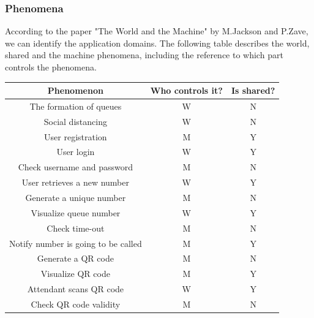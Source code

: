 \documentclass[table, 12pt]{article}
\begin{document}
\subsubsection{Phenomena}
According to the paper "The World and the Machine" by M.Jackson and P.Zave, we can identify the application domains. The following table describes the world, shared and the machine phenomena, including the reference to which part controls the phenomena.
\begin{center}
    \begin{table}
        \begin{tabular}{|c|c|c|}
            \hline
            \rowcolor{blue!50}
            Phenomenon                                 & Who controls it? & Is shared? \\
            \hline
            The formation of queues                    & W                & N          \\
            Social distancing                          & W                & N          \\
            User registration                          & M                & Y          \\
            User login                                 & W                & Y          \\
            Check username and password                & M                & N          \\
            User retrieves a new number                & W                & Y          \\
            Generate a unique number                   & M                & N          \\
            Visualize queue number                     & W                & Y          \\
            Check time-out                             & M                & N          \\
            Notify number is going to be called        & M                & Y          \\
            Generate a QR code                         & M                & N          \\
            Visualize QR code                          & M                & Y          \\
            Attendant scans QR code                    & W                & Y          \\
            Check QR code validity                     & M                & N          \\

\end{tabular}
\end{table}
\end{center}
\end{document}
